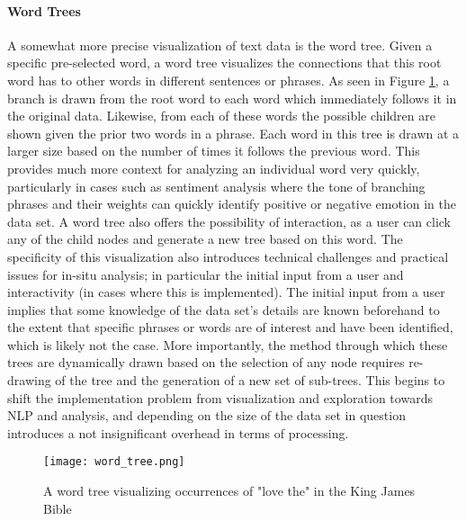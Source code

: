 \paragraph{Word Trees}
A somewhat more precise visualization of text data is the word tree\citep{Wattenberg2008}. Given a specific pre-selected word, a word tree visualizes the connections that this root word has to other words in different sentences or phrases. As seen in Figure \ref{fig:wordtree}, a branch is drawn from the root word to each word which immediately follows it in the original data. Likewise, from each of these words the possible children are shown given the prior two words in a phrase. Each word in this tree is drawn at a larger size based on the number of times it follows the previous word. This provides much more context for analyzing an individual word very quickly, particularly in cases such as sentiment analysis where the tone of branching phrases and their weights can quickly identify positive or negative emotion in the data set. A word tree also offers the possibility of interaction, as a user can click any of the child nodes and generate a new tree based on this word. The specificity of this visualization also introduces technical challenges and practical issues for in-situ analysis; in particular the initial input from a user and interactivity (in cases where this is implemented). The initial input from a user implies that some knowledge of the data set's details are known beforehand to the extent that specific phrases or words are of interest and have been identified, which is likely not the case. More importantly, the method through which these trees are dynamically drawn based on the selection of any node requires re-drawing of the tree and the generation of a new set of sub-trees. This begins to shift the implementation problem from visualization and exploration towards NLP and analysis, and depending on the size of the data set in question introduces a not insignificant overhead in terms of processing. 

\begin{figure}
	\centering
	\texttt{[image: word\_tree.png]}
	\caption{A word tree visualizing occurrences of "love the" in the King James Bible \citep{Wattenberg2008}}
	\label{fig:wordtree}
\end{figure}




